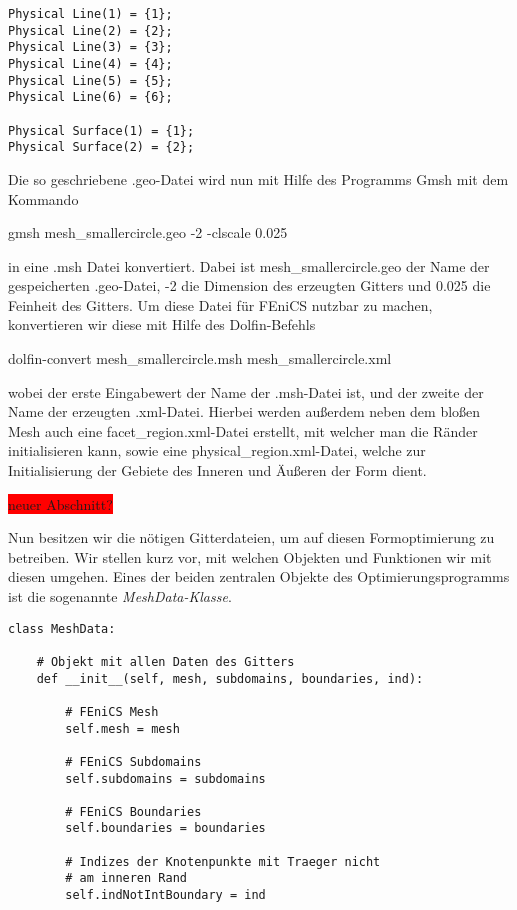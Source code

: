 \documentclass[bibliography=totoc,12pt,a4paper]{scrartcl}
\theoremstyle{exampstyle}
\numberwithin{equation}{section}
\begin{document}
\begin{lstlisting}
Physical Line(1) = {1};
Physical Line(2) = {2};
Physical Line(3) = {3};
Physical Line(4) = {4};
Physical Line(5) = {5};
Physical Line(6) = {6};

Physical Surface(1) = {1};
Physical Surface(2) = {2};
\end{lstlisting}

Die so geschriebene \textsf{.geo}-Datei wird nun mit Hilfe des Programms \textsf{Gmsh} mit dem Kommando

\begin{center}
\textsf{gmsh mesh\_smallercircle.geo -2 -clscale 0.025}
\end{center}

in eine \textsf{.msh} Datei konvertiert. Dabei ist \textsf{mesh\_smallercircle.geo}
der Name der gespeicherten \textsf{.geo}-Datei, \textsf{-2} die Dimension des erzeugten Gitters und \textsf{0.025} die Feinheit des Gitters. Um diese Datei für FEniCS nutzbar zu machen, konvertieren wir diese mit Hilfe des Dolfin-Befehls

\begin{center}
\textsf{dolfin-convert mesh\_smallercircle.msh mesh\_smallercircle.xml}
\end{center}

wobei der erste Eingabewert der Name der \textsf{.msh}-Datei ist, und der zweite der Name der erzeugten \textsf{.xml}-Datei. Hierbei werden außerdem neben dem bloßen Mesh auch eine \textsf{facet\_region.xml}-Datei erstellt, mit welcher man die Ränder initialisieren kann, sowie eine \textsf{physical\_region.xml}-Datei, welche zur Initialisierung der Gebiete des Inneren und Äußeren der Form dient.

\colorbox{red}{neuer Abschnitt?}

Nun besitzen wir die nötigen Gitterdateien, um auf diesen Formoptimierung zu betreiben. Wir stellen kurz vor, mit welchen Objekten und Funktionen wir mit diesen umgehen. Eines der beiden zentralen Objekte des Optimierungsprogramms ist die sogenannte \textit{MeshData-Klasse}. 

\begin{lstlisting}
class MeshData:

    # Objekt mit allen Daten des Gitters
    def __init__(self, mesh, subdomains, boundaries, ind):

        # FEniCS Mesh
        self.mesh = mesh

        # FEniCS Subdomains
        self.subdomains = subdomains

        # FEniCS Boundaries
        self.boundaries = boundaries

        # Indizes der Knotenpunkte mit Traeger nicht 
        # am inneren Rand
        self.indNotIntBoundary = ind
\end{lstlisting}
\end{document}
